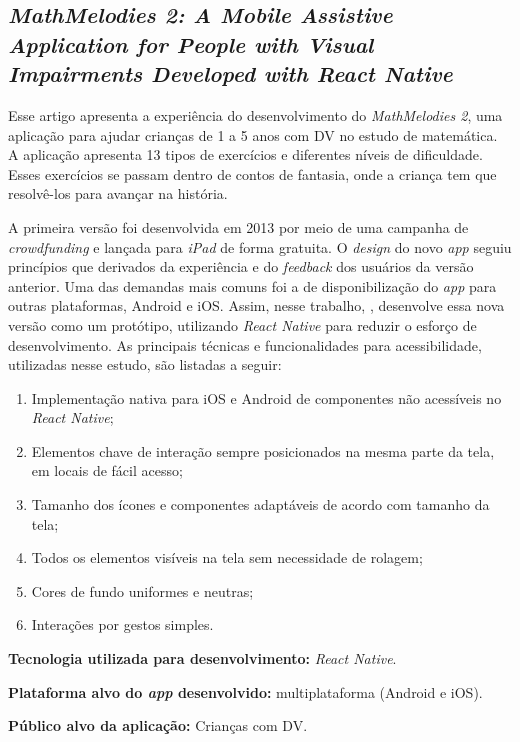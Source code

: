 \subsection{\emph{MathMelodies 2: A Mobile Assistive Application for People with Visual Impairments Developed with React Native}}

Esse artigo apresenta a experiência do desenvolvimento do \emph{MathMelodies 2}, uma aplicação para ajudar crianças de 1 a 5 anos com DV no estudo de matemática.
A aplicação apresenta 13 tipos de exercícios e diferentes níveis de dificuldade.
Esses exercícios se passam dentro de contos de fantasia, onde a criança tem que resolvê-los para avançar na história.

A primeira versão foi desenvolvida em 2013 por meio de uma campanha de \emph{crowdfunding} e lançada para \emph{iPad} de forma gratuita.
O \emph{design} do novo \emph{app} seguiu princípios que derivados da experiência e do \emph{feedback} dos usuários da versão anterior.
Uma das demandas mais comuns foi a de disponibilização do \emph{app} para outras plataformas, Android e iOS.
Assim, nesse trabalho, , desenvolve essa nova versão como um protótipo, utilizando \emph{React Native} para reduzir o esforço de desenvolvimento.
As principais técnicas e funcionalidades para acessibilidade, utilizadas nesse estudo, são listadas a seguir:

\begin{enumerate}
    \item Implementação nativa para iOS e Android de componentes não acessíveis no \emph{React Native};
    \item Elementos chave de interação sempre posicionados na mesma parte da tela, em locais de fácil acesso;
    \item Tamanho dos ícones e componentes adaptáveis de acordo com tamanho da tela;
    \item Todos os elementos visíveis na tela sem necessidade de rolagem;
    \item Cores de fundo uniformes e neutras;
    \item Interações por gestos simples.
\end{enumerate}

\textbf{Tecnologia utilizada para desenvolvimento:} \emph{React Native}.

\textbf{Plataforma alvo do \emph{app} desenvolvido:} multiplataforma (Android e iOS).

\textbf{Público alvo da aplicação:} Crianças com DV\@.


